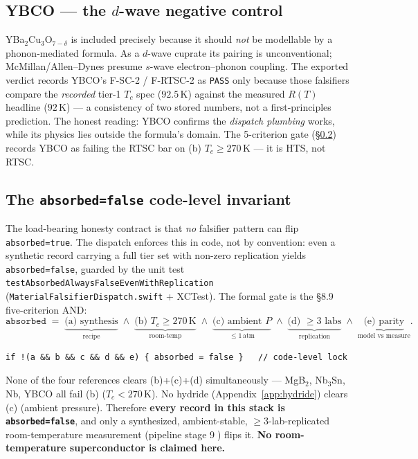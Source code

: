 \subsection{YBCO --- the $d$-wave negative control}
\label{app:mat-ybco}

YBa$_2$Cu$_3$O$_{7-\delta}$ is included precisely because it should
\emph{not} be modellable by a phonon-mediated formula. As a $d$-wave
cuprate its pairing is unconventional; McMillan/Allen--Dynes presume
$s$-wave electron--phonon coupling. The exported verdict records YBCO's
F-SC-2 / F-RTSC-2 as \texttt{PASS} only because those falsifiers compare
the \emph{recorded} tier-1 $T_c$ spec ($92.5$\,K) against the measured
$R(T)$ headline ($92$\,K) --- a consistency of two stored numbers, not a
first-principles prediction. The honest reading: YBCO confirms the
\emph{dispatch plumbing} works, while its physics lies outside the
formula's domain. The 5-criterion gate (\S\ref{app:mat-invariant}) records
YBCO as failing the RTSC bar on (b) $T_c\!\ge\!270$\,K --- it is HTS, not
RTSC.

\subsection{The \texttt{absorbed=false} code-level invariant}
\label{app:mat-invariant}

The load-bearing honesty contract is that \emph{no} falsifier pattern can
flip \texttt{absorbed=true}. The dispatch enforces this in code, not by
convention: even a synthetic record carrying a full tier set with non-zero
replication yields \texttt{absorbed=false}, guarded by the unit test
\texttt{testAbsorbedAlwaysFalseEvenWithReplication}
(\texttt{MaterialFalsifierDispatch.swift} + XCTest). The formal gate is the
\S8.9 five-criterion AND:
\begin{equation}
\texttt{absorbed} \;=\;
  \underbrace{\text{(a) synthesis}}_{\text{recipe}} \;\wedge\;
  \underbrace{\text{(b) } T_c\!\ge\!270\,\text{K}}_{\text{room-temp}} \;\wedge\;
  \underbrace{\text{(c) ambient } P}_{\le 1\,\text{atm}} \;\wedge\;
  \underbrace{\text{(d) } \ge\!3\text{ labs}}_{\text{replication}} \;\wedge\;
  \underbrace{\text{(e) parity}}_{\text{model vs measure}} .
\label{eq:fivegate}
\end{equation}
\begin{lstlisting}
if !(a && b && c && d && e) { absorbed = false }   // code-level lock
\end{lstlisting}
None of the four references clears (b)+(c)+(d) simultaneously --- MgB$_2$,
Nb$_3$Sn, Nb, YBCO all fail (b) ($T_c\!<\!270$\,K). No hydride
(Appendix~\ref{app:hydride}) clears (c) (ambient pressure). Therefore
\textbf{every record in this stack is \texttt{absorbed=false}}, and only a
synthesized, ambient-stable, $\ge\!3$-lab-replicated room-temperature
measurement (pipeline stage \textcircled{\scriptsize 9}) flips it.
\textbf{No room-temperature superconductor is claimed here.}
